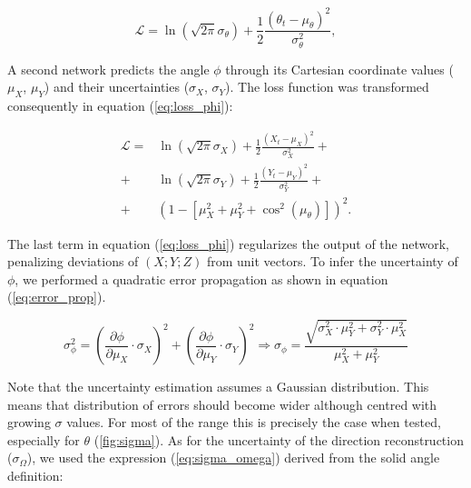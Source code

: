 \begin{equation}
	\label{eq:loss_theta}
	\mathcal{L} = \ln (\sqrt{2\pi}\sigma_{\theta}) + \frac{1}{2}\frac{(\theta_{t}-\mu_{\theta} )^2}{\sigma_{\theta}^2},
\end{equation}


A second network predicts the angle $\phi$ through its Cartesian coordinate values ($\mu_X$, $\mu_Y$) and their uncertainties ($\sigma_X$, $\sigma_Y$). The loss function was transformed consequently in equation (\ref{eq:loss_phi}):


\begin{equation}
	\label{eq:loss_phi}
	\begin{split}
		\mathcal{L} = &\ln (\sqrt{2\pi}\sigma_{X}) + \frac{1}{2}\frac{(X_{t}-\mu_{X} )^2}{\sigma_{X}^2}+\\
		+ &\ln (\sqrt{2\pi}\sigma_{Y}) + \frac{1}{2}\frac{(Y_{t}-\mu_{Y} )^2}{\sigma_{Y}^2}+\\
		+ &(1-[\mu_{X}^2+\mu_{Y}^2+\cos^2(\mu_{\theta})])^2.
	\end{split}
\end{equation}

The last term in equation (\ref{eq:loss_phi}) regularizes the output of the network, penalizing deviations of $(X;Y;Z)$ from unit vectors. %
To infer the uncertainty of $\phi$, we performed a quadratic error propagation as shown in equation (\ref{eq:error_prop}).

\begin{equation}
	\label{eq:error_prop}
	\sigma_{\phi}^2 = \left(\frac{\partial \phi}{\partial \mu_X}\cdot \sigma_X\right)^2 + \left(\frac{\partial \phi}{\partial \mu_Y}\cdot \sigma_Y\right)^2 \Rightarrow
	\sigma_{\phi} = \frac{\sqrt{\sigma_X^2\cdot \mu_Y^2+\sigma_Y^2\cdot \mu_X^2}}{\mu_X^2+\mu_Y^2 }
\end{equation}

Note that the uncertainty estimation assumes a Gaussian distribution. This means that distribution of errors should become wider although centred with growing $\sigma$ values. For most of the range this is precisely the case when tested, especially for $\theta$ (\autoref{fig:sigma}). As for the uncertainty of the direction reconstruction ($\sigma_{\Omega}$),  we used the expression (\ref{eq:sigma_omega}) derived from the solid angle definition: 

